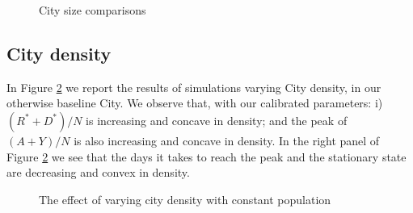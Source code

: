 \documentclass[english,11pt]{article}
\begin{document}
\begin{figure}[H]
\caption{City size comparisons\label{fig:City-size}}
\centering{}
\end{figure}

\subsection{City density}
In Figure \ref{fig:density} we report the results of 
    simulations varying City density, in our otherwise baseline City.   
 We observe that, with our calibrated parameters: i) $(R^*+D^*)/N$ is increasing and concave in density; and the peak of $(A+Y)/N$ is also increasing and concave in density. In the right panel of  Figure \ref{fig:density} we see that the days it takes to reach the peak and the stationary state are decreasing and convex in density. %




\begin{figure}[H]
\caption{The effect of varying city density with constant population\label{fig:density}}
\centering{}
\end{figure}

\newpage


\end{document}
